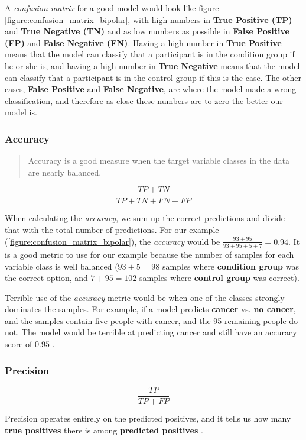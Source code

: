 A \textit{confusion matrix} for a good model would look like figure \ref{figure:confusion_matrix_bipolar}, with high numbers in \textbf{True Positive (TP)} and \textbf{True Negative (TN)} and as low numbers as possible in \textbf{False Positive (FP)} and \textbf{False Negative (FN)}. Having a high number in \textbf{True Positive} means that the model can classify that a participant is in the condition group if he or she is, and having a high number in \textbf{True Negative} means that the model can classify that a participant is in the control group if this is the case. The other cases, \textbf{False Positive} and \textbf{False Negative}, are where the model made a wrong classification, and therefore as close these numbers are to zero the better our model is.

\subsubsection{Accuracy}

\blockquote[\cite{ml_metrics}]{Accuracy is a good measure when the target variable classes in the data are nearly balanced.}

\[ \frac{TP + TN}{TP + TN + FN + FP} \]

When calculating the \textit{accuracy}, we sum up the correct predictions and divide that with the total number of predictions. For our example (\ref{figure:confusion_matrix_bipolar}), the \textit{accuracy} would be $ \frac{93 + 95}{93 + 95 + 5 + 7} = 0.94 $. It is a good metric to use for our example because the number of samples for each variable class is well balanced ($ 93+5=98 $ samples where \textbf{condition group} was the correct option, and $ 7+95=102 $ samples where \textbf{control group} was correct).

Terrible use of the \textit{accuracy} metric would be when one of the classes strongly dominates the samples. For example, if a model predicts \textbf{cancer} vs. \textbf{no cancer}, and the samples contain five people with cancer, and the 95 remaining people do not. The model would be terrible at predicting cancer and still have an accuracy score of $ 0.95 $ \cite{ml_metrics}.

\subsubsection{Precision} 

\[ \frac{TP}{TP + FP} \]

Precision operates entirely on the predicted positives, and it tells us how many \textbf{true positives} there is among \textbf{predicted positives} \cite{ml_metrics}. 

